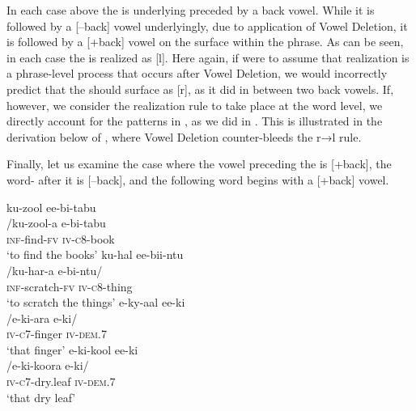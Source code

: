 \documentclass[output=paper,modfonts,nonflat,
colorlinks, citecolor=brown,
draftmode,
]{langsci/langscibook}
\begin{document}
In each case above the  is underlying preceded by a back vowel. While it is followed by a [--back] vowel underlyingly, due to application of Vowel Deletion, it is followed by a [+back] vowel on the surface within the phrase. As can be seen, in each case the  is realized as [l]. Here again, if were to assume that  realization is a phrase-level process that occurs after Vowel Deletion, we would incorrectly predict that the  should surface as [r], as it did in  between two back vowels. If, however, we consider the  realization rule to take place at the word level, we directly account for the patterns in , as we did in . This is illustrated in the derivation below of , where Vowel Deletion counter-bleeds the r→l rule.

\ea\label{ex:bickmore:19}
\z

Finally, let us examine the case where the vowel preceding the  is [+back], the word- after it is [--back], and the following word begins with a [+back] vowel.

\ea\label{ex:bickmore:20}
\ea\label{ex:bickmore:20a}
\glll ku-zool ee-bi-tabu\\
      /ku-zool-a e-bi-tabu    \\
\textsc{inf-}\textup{find}\textsc{-fv} \textsc{iv-\textsc{c8}-}\textup{book}\\
\glt      ‘to find the books’
\ex\label{ex:bickmore:20b}
\glll  ku-hal ee-bii-ntu    \\
      /ku-har-a e-bi-ntu/	\\
\textsc{inf-}\textup{scratch}\textsc{-fv} \textsc{iv-\textsc{c8}-}\textup{thing}\\
\glt      ‘to scratch the things’
\ex\label{ex:bickmore:20c}
\glll e-ky-aal ee-ki    \\
      /e-ki-ara e-ki/	\\
\textsc{iv-\textsc{c7}-}\textup{finger} \textsc{iv-dem.7}\\
\glt      ‘that finger’
\ex\label{ex:bickmore:20d}
\glll e-ki-kool ee-ki    \\
      /e-ki-koora e-ki/	\\
\textsc{iv-\textsc{c7}-}\textup{dry.leaf} \textsc{iv-dem.7}\\
\glt      ‘that dry leaf’
\z
\z
\end{document}
